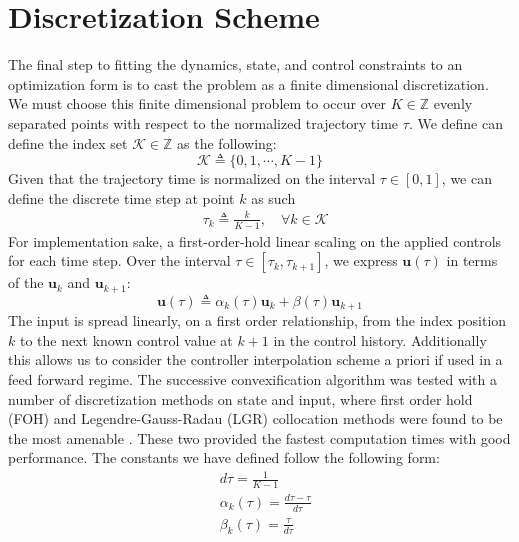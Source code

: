 \section{Discretization Scheme}
The final step to fitting the dynamics, state, and control constraints to an optimization form is to cast the problem as a finite dimensional discretization. We must choose this finite dimensional problem to occur over $K\in\mathbb{Z}$ evenly separated points with respect to the normalized trajectory time $\tau$. We define can define the index set $\mathcal{K}\in\mathbb{Z}$ as the following:
\begin{equation*}
	\mathcal{K}\triangleq \{0,1,\cdots, K-1\}
\end{equation*}
%
Given that the trajectory time is normalized on the interval $\tau \in [0,1 ]$, we can define the discrete time step at point $k$ as such
%
\begin{align}
& \tau_k \triangleq \frac{k}{K-1}, \quad \forall k \in \mathcal{K}
\end{align}
%
For implementation sake, a first-order-hold linear scaling on the applied controls for each time step. Over the interval $\tau \in [\tau_k, \tau_{k+1}]$, we express $\mathbf{u}(\tau)$ in terms of the $\mathbf{u}_k$
 and $\mathbf{u}_{k+1}$:
\begin{equation}
	\mathbf{u}(\tau) \triangleq \alpha_k(\tau) \mathbf{u}_k + \beta(\tau) \mathbf{u}_{k+1}
\end{equation}
%
The input is spread linearly, on a first order relationship, from the index position $k$ to the next known control value at $k+1$ in the control history. Additionally this allows us to consider the controller interpolation scheme a priori if used in a feed forward regime. The successive convexification algorithm was tested with a number of discretization methods on state and input, where first order hold (FOH) and Legendre-Gauss-Radau (LGR) collocation methods were found to be the most amenable \cite{malyuta2019discrete}. These two provided the fastest computation times with good performance.
%
The constants we have defined follow the following form:
\begin{align}
& d\tau = \frac{1}{K-1} \\
& \alpha_k(\tau) = \frac{d\tau - \tau}{d\tau} \\
& \beta_k(\tau) = \frac{\tau}{d\tau}
\end{align}
%

